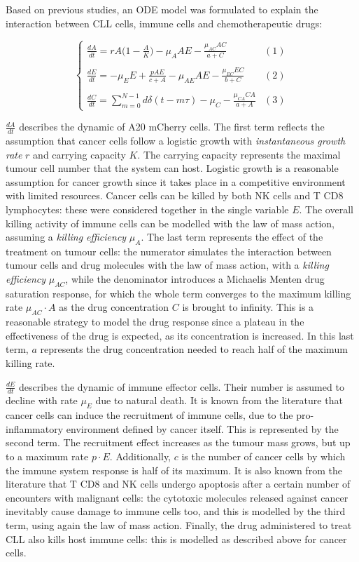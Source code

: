 Based on previous studies, an ODE model was formulated to explain the interaction between CLL cells, immune cells and chemotherapeutic drugs:

\[
\begin{cases} 
	\frac{dA}{dt} = rA \bigl( 1 - \frac{A}{K} \bigr) - \mu_A AE - \frac{\mu_{AC} AC}{a+C} & (1)\\ \\
	\frac{dE}{dt} = -\mu_E E + \frac{pAE}{c+A} - \mu_{AE} AE - \frac{\mu_{EC} EC}{b+C} & (2) \\ \\
	\frac{dC}{dt} = \sum_{m=0}^{N-1} d\delta (t-m\tau) - \mu_{C} - \frac{\mu_{CA} CA}{a+A} & (3) 
\end{cases}
\]

$\frac{dA}{dt}$ describes the dynamic of A20 mCherry cells. The first term reflects the assumption that cancer cells follow a logistic growth with \textit{instantaneous growth rate} $r$ and carrying capacity $K$. The carrying capacity represents the maximal tumour cell number that the system can host. Logistic growth is a reasonable assumption for cancer growth since it takes place in a competitive environment with limited resources. Cancer cells can be killed by both NK cells and T CD8 lymphocytes: these were considered together in the single variable $E$. The overall killing activity of immune cells can be modelled with the law of mass action, assuming a \textit{killing efficiency} $\mu_{A}$. The last term represents the effect of the treatment on tumour cells: the numerator simulates the interaction between tumour cells and drug molecules with the law of mass action, with a \textit{killing efficiency} $\mu_{AC}$, while the denominator introduces a Michaelis Menten drug saturation response, for which the whole term converges to the maximum killing rate $\mu_{AC} \cdot A$ as the drug concentration $C$ is brought to infinity. This is a reasonable strategy to model the drug response since a plateau in the effectiveness of the drug is expected, as its concentration is increased. In this last term, $a$ represents the drug concentration needed to reach half of the maximum killing rate. \par
\vspace{0.4cm}
$\frac{dE}{dt}$ describes the dynamic of immune effector cells. Their number is assumed to decline with rate $\mu_{E}$ due to natural death. It is known from the literature that cancer cells can induce the recruitment of immune cells, due to the pro-inflammatory environment defined by cancer itself. This is represented by the second term. The recruitment effect increases as the tumour mass grows, but up to a maximum rate $p \cdot E$. Additionally, $c$ is the number of cancer cells by which the immune system response is half of its maximum. It is also known from the literature that T CD8 and NK cells undergo apoptosis after a certain number of encounters with malignant cells: the cytotoxic molecules released against cancer inevitably cause damage to immune cells too, and this is modelled by the third term, using again the law of mass action. Finally, the drug administered to treat CLL also kills host immune cells: this is modelled as described above for cancer cells. \par
